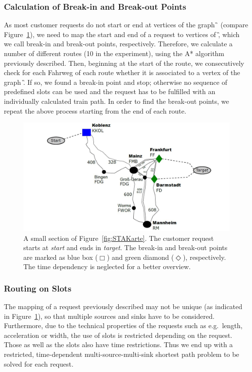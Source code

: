 \subsubsection{Calculation of Break-in and Break-out Points}
%
As most customer requests do not start or end at vertices of the graph \G\, (compare Figure~\ref{fig:E-A-Pkte}), we need to map the start and end of a request to vertices of \G, which we call break-in and break-out points, respectively. Therefore, we calculate a number of different routes (10 in the experiment), using the A* algorithm previously described. Then, beginning at the start of the route, we consecutively check for each Fahrweg of each route whether it is associated to a vertex of the graph \G. If so, we found a break-in point and stop; otherwise no sequence of predefined slots can be used and the request has to be fulfilled with an individually calculated train path. In order to find the break-out points, we repeat the above process starting from the end of each route.
%
\begin{figure}[tb]
	\centering
	\includegraphics[scale=0.30]{Bilder/Kor1_EA_Farbe.jpg}
	\caption{A small section of Figure~\ref{fig:STAKarte}. The customer request starts at \emph{start} and ends in \emph{target}. The break-in and break-out points are marked as blue box ($\Box$) and green diamond ($\Diamond$), respectively. The time dependency is neglected for a better overview.}
	\label{fig:E-A-Pkte}
\end{figure}

\subsubsection{Routing on Slots}
The mapping of a request previously described may not be unique (as indicated in Figure~\ref{fig:E-A-Pkte}), so that multiple sources and sinks have to be considered. Furthermore, due to the technical properties of the requests such as e.g.\ length, acceleration or width, the use of slots is restricted depending on the request. Those as well as the slots also have time restrictions. Thus we end up with a restricted, time-dependent multi-source-multi-sink shortest path problem to be solved for each request.

